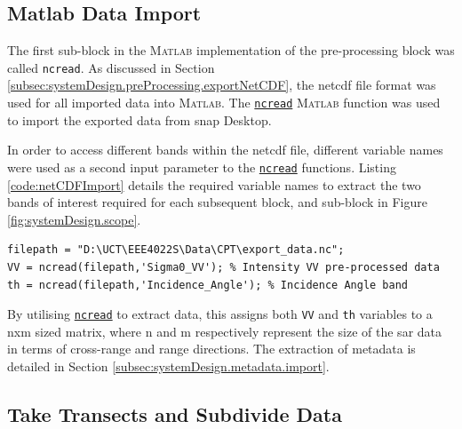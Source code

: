 \subsection{Matlab Data Import} \label{subsec:systemDesign.preProcessing.importData}

The first sub-block in the \textsc{Matlab} implementation of the pre-processing block was called \lstinline{ncread}. As discussed in Section \ref{subsec:systemDesign.preProcessing.exportNetCDF}, the \acs{netcdf} file format was used for all imported data into \textsc{Matlab}. The \href{https://www.mathworks.com/help/Matlab/ref/ncread.html}{\lstinline{ncread}} \textsc{Matlab} function was used to import the exported data from \acs{snap} Desktop.

In order to access different bands within the \acs{netcdf} file, different variable names were used as a second input parameter to the \href{https://www.mathworks.com/help/Matlab/ref/ncread.html}{\lstinline{ncread}} functions. Listing \ref{code:netCDFImport} details the required variable names to extract the two bands of interest required for each subsequent block, and sub-block in Figure \ref{fig:systemDesign.scope}.

\begin{lstlisting}[caption={\textsc{Matlab} code used to import all desired bands from exported \acs{netcdf} data from \acs{snap} Desktop.},label={code:netCDFImport}]
filepath = "D:\UCT\EEE4022S\Data\CPT\export_data.nc";
VV = ncread(filepath,'Sigma0_VV'); % Intensity VV pre-processed data
th = ncread(filepath,'Incidence_Angle'); % Incidence Angle band
\end{lstlisting}

By utilising \href{https://www.mathworks.com/help/Matlab/ref/ncread.html}{\lstinline{ncread}} to extract data, this assigns both \lstinline{VV} and \lstinline{th} variables to a nxm sized matrix, where n and m respectively represent the size of the \acs{sar} data in terms of cross-range and range directions. The extraction of metadata is detailed in Section \ref{subsec:systemDesign.metadata.import}.



\subsection{Take Transects and Subdivide Data} \label{subsec:systemDesign.preProcessing.transects}

